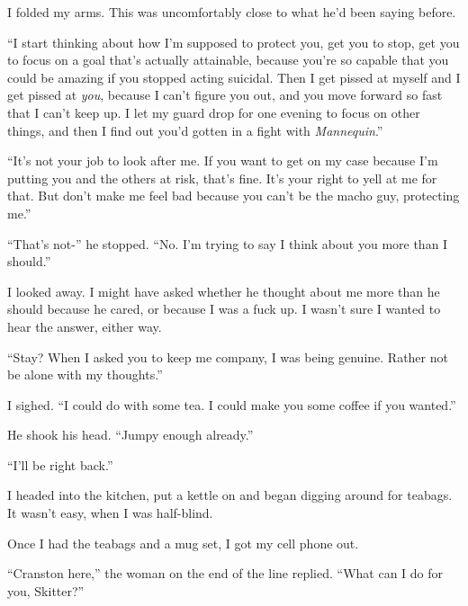 I folded my arms.  This was uncomfortably close to what he'd been saying before.



``I start thinking about how I'm supposed to protect you, get you to stop, get you to focus on a goal that's actually attainable, because you're so capable that you could be amazing if you stopped acting suicidal.  Then I get pissed at myself and I get pissed at \emph{you}, because I can't figure you out, and you move forward so fast that I can't keep up.  I let my guard drop for one evening to focus on other things, and then I find out you'd gotten in a fight with \emph{Mannequin}.''



``It's not your job to look after me.  If you want to get on my case because I'm putting you and the others at risk, that's fine.  It's your right to yell at me for that.  But don't make me feel bad because you can't be the macho guy, protecting me.''



``That's not-'' he stopped.  ``No.  I'm trying to say I think about you more than I should.''



I looked away.  I might have asked whether he thought about me more than he should because he cared, or because I was a fuck up.  I wasn't sure I wanted to hear the answer, either way.



``Stay?  When I asked you to keep me company, I was being genuine.  Rather not be alone with my thoughts.''



I sighed.  ``I could do with some tea.  I could make you some coffee if you wanted.''



He shook his head.  ``Jumpy enough already.''



``I'll be right back.''



I headed into the kitchen, put a kettle on and began digging around for teabags.  It wasn't easy, when I was half-blind.



Once I had the teabags and a mug set, I got my cell phone out.



``Cranston here,'' the woman on the end of the line replied.  ``What can I do for you, Skitter?''



